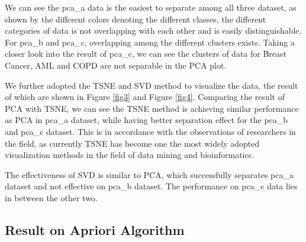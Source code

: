 \documentclass[fleqn]{llncs}
\begin{document}
We can see the pca\_a data is the easiest to separate among all three dataset, as shown by the different colors denoting the different classes, the different categories of data is not overlapping with each other and is easily distinguishable. For pca\_b and pca\_c, overlapping among the different clusters exists. Taking a closer look into the result of pca\_c, we can see the clusters of data for Breast Cancer, AML and COPD are not separable in the PCA plot.

We further adopted the TSNE and SVD method to visualize the data, the result of which are shown in Figure \ref{fig3} and Figure \ref{fig4}. Comparing the result of PCA with TSNE, we can see the TSNE method is achieving similar performance as PCA in pca\_a dataset, while having better separation effect for the pca\_b and pca\_c dataset. This is in accordance with the observations of researchers in the field, as currently TSNE has become one the most widely adopted visualization methods in the field of data mining and bioinformatics.

The effectiveness of SVD is similar to PCA, which successfully separates pca\_a dataset and not effective on pca\_b dataset. The performance on pca\_c data lies in between the other two.


\subsection{Result on Apriori Algorithm} 










\end{document}
